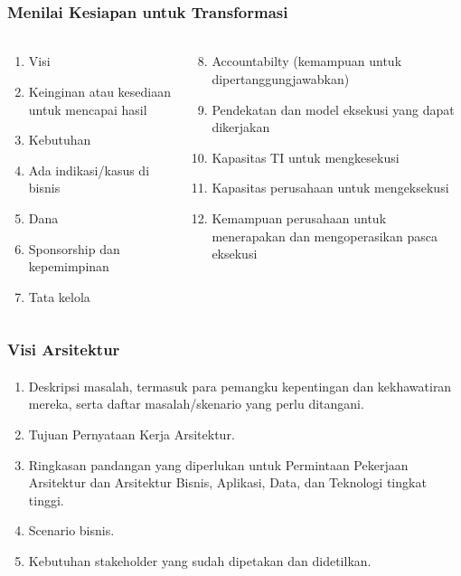 \documentclass[aspectratio=169, table]{beamer}
\begin{document}
	\begin{frame}
		\frametitle{Menilai Kesiapan untuk Transformasi}

		\framesubtitle{\hspace{1cm}}
		\begin{columns}
			\begin{column}{0.5\textwidth}
				\begin{enumerate}
					\item Visi
					\item Keinginan atau kesediaan untuk mencapai hasil
					\item Kebutuhan
					\item Ada indikasi/kasus di bisnis
					\item Dana
					\item Sponsorship dan kepemimpinan
					\item Tata kelola

				\end{enumerate}
			\end{column}
			\begin{column}{0.5\textwidth}
				\begin{enumerate}
					\setcounter{enumi}{7}
					\item Accountabilty (kemampuan untuk dipertanggungjawabkan)
					\item Pendekatan dan model eksekusi yang dapat dikerjakan
					\item Kapasitas TI untuk mengkesekusi
					\item Kapasitas perusahaan untuk mengeksekusi
					\item Kemampuan perusahaan untuk menerapakan dan mengoperasikan pasca eksekusi
				\end{enumerate}
			\end{column}
		\end{columns}
	\end{frame}

	\begin{frame}
		\frametitle{Visi Arsitektur}
		\framesubtitle{\hspace{1cm}}
		\begin{enumerate}
			\item Deskripsi masalah, termasuk para pemangku kepentingan dan kekhawatiran mereka, serta daftar masalah/skenario yang perlu ditangani.
			\item Tujuan Pernyataan Kerja Arsitektur.
			\item Ringkasan pandangan yang diperlukan untuk Permintaan Pekerjaan Arsitektur dan Arsitektur Bisnis, Aplikasi, Data, dan Teknologi tingkat tinggi.
			\item Scenario bisnis.
			\item Kebutuhan stakeholder yang sudah dipetakan dan didetilkan.
		\end{enumerate}
	\end{frame}
\end{document}
